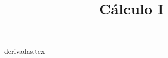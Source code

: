 \documentclass[xcolor=table]{beamer}
\title{Cálculo I}
\begin{document}
  {derivadas.tex}
\end{document}
